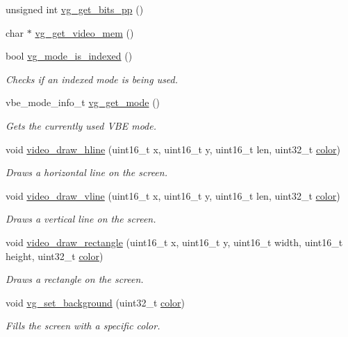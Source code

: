 \begin{DoxyCompactItemize}
\item 
unsigned int \mbox{\hyperlink{group__video_ga6db41c530c9cfe3cb6fb0d553abd6bc4}{vg\+\_\+get\+\_\+bits\+\_\+pp}} ()
\item 
char $\ast$ \mbox{\hyperlink{group__video_ga0cd2b85b0088ab47b2b7bb6c135ad4b1}{vg\+\_\+get\+\_\+video\+\_\+mem}} ()
\item 
bool \mbox{\hyperlink{group__video_ga045a67e6823cba5cf0778c4bc7440b5b}{vg\+\_\+mode\+\_\+is\+\_\+indexed}} ()
\begin{DoxyCompactList}\small\item\em Checks if an indexed mode is being used. \end{DoxyCompactList}\item 
vbe\+\_\+mode\+\_\+info\+\_\+t \mbox{\hyperlink{group__video_ga01a3ec260077196f30943673a3d4b451}{vg\+\_\+get\+\_\+mode}} ()
\begin{DoxyCompactList}\small\item\em Gets the currently used V\+BE mode. \end{DoxyCompactList}\item 
void \mbox{\hyperlink{group__video_gaa81a86216d20abdc74fffe6a374d7c84}{video\+\_\+draw\+\_\+hline}} (uint16\+\_\+t x, uint16\+\_\+t y, uint16\+\_\+t len, uint32\+\_\+t \mbox{\hyperlink{structcolor}{color}})
\begin{DoxyCompactList}\small\item\em Draws a horizontal line on the screen. \end{DoxyCompactList}\item 
void \mbox{\hyperlink{group__video_ga5176eeba2bfc4ebcf67374bda8aceb19}{video\+\_\+draw\+\_\+vline}} (uint16\+\_\+t x, uint16\+\_\+t y, uint16\+\_\+t len, uint32\+\_\+t \mbox{\hyperlink{structcolor}{color}})
\begin{DoxyCompactList}\small\item\em Draws a vertical line on the screen. \end{DoxyCompactList}\item 
void \mbox{\hyperlink{group__video_ga141b925836a12854efeb2d84b6e1542c}{video\+\_\+draw\+\_\+rectangle}} (uint16\+\_\+t x, uint16\+\_\+t y, uint16\+\_\+t width, uint16\+\_\+t height, uint32\+\_\+t \mbox{\hyperlink{structcolor}{color}})
\begin{DoxyCompactList}\small\item\em Draws a rectangle on the screen. \end{DoxyCompactList}\item 
void \mbox{\hyperlink{group__video_ga6e2c7948df1662b15b1977cf20e8e479}{vg\+\_\+set\+\_\+background}} (uint32\+\_\+t \mbox{\hyperlink{structcolor}{color}})
\begin{DoxyCompactList}\small\item\em Fills the screen with a specific color. \end{DoxyCompactList}\end{DoxyCompactItemize}
